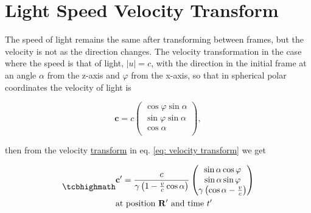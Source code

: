 \section{Light Speed Velocity Transform} \label{sect: Light Speed Velocity Transform}

The speed of light remains the same after transforming between frames, but the velocity is not as the direction changes.
The velocity transformation in the case where the speed is that of light, $|u| = {c}$, with the direction in the initial frame at an angle $\alpha$ from the z-axis and $\varphi$ from the x-axis, so that in spherical polar coordinates the velocity of light is

\begin{equation}
	\mathbf{c} = {c}
	\begin{pmatrix}
		\cos{\varphi}\sin{\alpha} \\
		\sin{\varphi}\sin{\alpha} \\
		\cos{\alpha}              \\
	\end{pmatrix},
\end{equation}

then from the velocity \hyperlink{def-transform}{transform} in eq.
\eqref{eq: velocity transform} we get


\begin{equation}
	\label{eq: velocity transform for light}
	\mhl{
		\begin{aligned}
			 & \mathbf{c}{'} = \dfrac{c}{{\gamma}\left(1-\frac{v}{c} \cos\alpha\right) }
			\begin{pmatrix}
				\sin\alpha\cos\varphi                          \\
				\sin\alpha\sin\varphi                          \\
				{\gamma} \left( \cos\alpha-\frac{v}{c} \right) \\
			\end{pmatrix}
			\\
			 & \text{at position $\mathbf{R}{'}$ and time ${t{'}}$ }
		\end{aligned}
	}
\end{equation}

